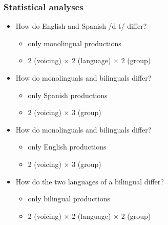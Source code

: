 \documentclass{beamer}
\begin{document}
\begin{frame}
\frametitle{Statistical analyses}
\begin{itemize}
	\item How do English and Spanish /d t/ differ?
	\begin{itemize}
		\item only monolingual productions
		\item 2 (voicing) $\times$ 2 (language) $\times$ 2 (group)
	\end{itemize}
	\item How do monolinguals and bilinguals differ?
	\begin{itemize}
		\item only Spanish productions
		\item 2 (voicing) $\times$ 3 (group)
	\end{itemize}
	\item How do monolinguals and bilinguals differ?
	\begin{itemize}
		\item only English productions
		\item 2 (voicing) $\times$ 3 (group)
	\end{itemize}
	\item How do the two languages of a bilingual differ?
	\begin{itemize}
		\item only bilingual productions
		\item 2 (voicing) $\times$ 2 (language) $\times$ 2 (group)
	\end{itemize}
\end{itemize}
\end{frame}
\end{document}
